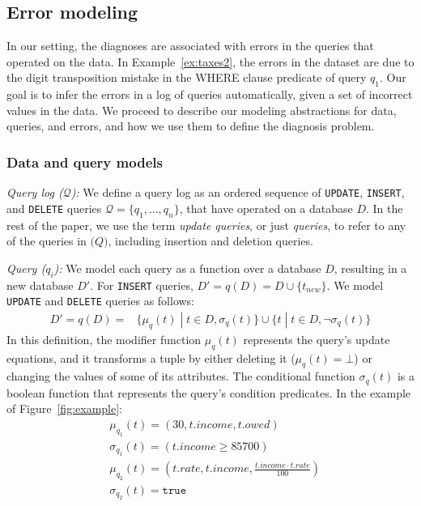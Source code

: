 % 

\subsection{Error modeling}
\label{sec:model}

In our setting, the diagnoses are associated with errors in the queries that
operated on the data. In Example~\ref{ex:taxes2}, the errors in the dataset
are due to the digit transposition mistake in the WHERE clause predicate of
query $q_1$. Our goal is to infer the errors in a log of queries
automatically, given a set of incorrect values in the data. We proceed to
describe our modeling abstractions for data, queries, and errors, and how we
use them to define the diagnosis problem.

\subsubsection*{Data and query models}
\label{sec:models}

\noindent
\emph{Query log ($\mathcal{Q}$):}
We define a query log as an ordered sequence of \texttt{UPDATE}, \texttt{INSERT}, and
\texttt{DELETE} queries $\mathcal{Q}=\{q_1,\dots,q_n\}$, that have
operated on a database $D$. In the rest of the paper, we use the term
\emph{update queries}, or just \emph{queries}, to refer to any of the queries in $\mathcal(Q)$,
including insertion and deletion queries.

\smallskip
\noindent
\emph{Query ($q_i$):} We model each query as a function over a
database $D$, resulting in a new database $D'$. For \texttt{INSERT}
queries, $D'=q(D)=D\cup\{t_{new}\}$.
We model \texttt{UPDATE} and \texttt{DELETE} queries as follows:  
\begin{align*}
    D'=q(D)= &\{\mu_{q}(t)\;|\;t\in D, \sigma_{q}(t)\}%
    \cup\{t\;|\;t\in D, \neg\sigma_{q}(t)\}%
\end{align*}
% 
In this definition, the modifier function $\mu_q(t)$ represents the query's update equations, and it transforms a tuple by either deleting it ($\mu_q(t)=\bot$) or changing the values of some of its attributes.
The conditional function $\sigma_q(t)$ is a boolean function that represents the query's condition predicates.  In the example of Figure~\ref{fig:example}:
\begin{align*}
    &\mu_{q_1}(t)=(30, t.income, t.owed)\\
    &\sigma_{q_1}(t)=(t.income\ge 85700)\\
    &\mu_{q_2}(t)=(t.rate, t.income, \frac{t.income\cdot t.rate}{100})\\
    &\sigma_{q_2}(t)=\texttt{true}
\end{align*} 
% 


